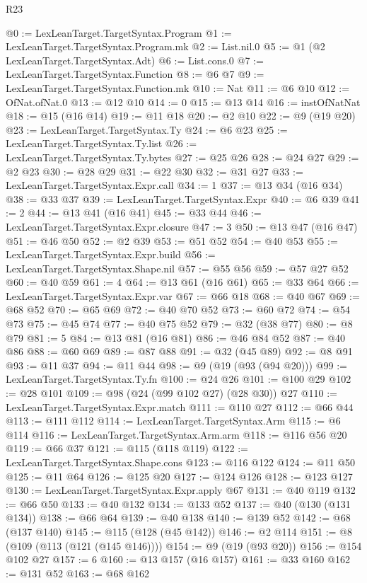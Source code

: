 \begin{lexlean}{R23}
\begin{coremodule}
@0 := LexLeanTarget.TargetSyntax.Program
@1 := LexLeanTarget.TargetSyntax.Program.mk
@2 := List.nil.{0}
@5 := @1 (@2 LexLeanTarget.TargetSyntax.Adt)
@6 := List.cons.{0}
@7 := LexLeanTarget.TargetSyntax.Function
@8 := @6 @7
@9 := LexLeanTarget.TargetSyntax.Function.mk
@10 := Nat
@11 := @6 @10
@12 := OfNat.ofNat.{0}
@13 := @12 @10
@14 := 0
@15 := @13 @14
@16 := instOfNatNat
@18 := @15 (@16 @14)
@19 := @11 @18
@20 := @2 @10
@22 := @9 (@19 @20)
@23 := LexLeanTarget.TargetSyntax.Ty
@24 := @6 @23
@25 := LexLeanTarget.TargetSyntax.Ty.list
@26 := LexLeanTarget.TargetSyntax.Ty.bytes
@27 := @25 @26
@28 := @24 @27
@29 := @2 @23
@30 := @28 @29
@31 := @22 @30
@32 := @31 @27
@33 := LexLeanTarget.TargetSyntax.Expr.call
@34 := 1
@37 := @13 @34 (@16 @34)
@38 := @33 @37
@39 := LexLeanTarget.TargetSyntax.Expr
@40 := @6 @39
@41 := 2
@44 := @13 @41 (@16 @41)
@45 := @33 @44
@46 := LexLeanTarget.TargetSyntax.Expr.closure
@47 := 3
@50 := @13 @47 (@16 @47)
@51 := @46 @50
@52 := @2 @39
@53 := @51 @52
@54 := @40 @53
@55 := LexLeanTarget.TargetSyntax.Expr.build
@56 := LexLeanTarget.TargetSyntax.Shape.nil
@57 := @55 @56
@59 := @57 @27 @52
@60 := @40 @59
@61 := 4
@64 := @13 @61 (@16 @61)
@65 := @33 @64
@66 := LexLeanTarget.TargetSyntax.Expr.var
@67 := @66 @18
@68 := @40 @67
@69 := @68 @52
@70 := @65 @69
@72 := @40 @70 @52
@73 := @60 @72
@74 := @54 @73
@75 := @45 @74
@77 := @40 @75 @52
@79 := @32 (@38 @77)
@80 := @8 @79
@81 := 5
@84 := @13 @81 (@16 @81)
@86 := @46 @84 @52
@87 := @40 @86
@88 := @60 @69
@89 := @87 @88
@91 := @32 (@45 @89)
@92 := @8 @91
@93 := @11 @37
@94 := @11 @44
@98 := @9 (@19 (@93 (@94 @20)))
@99 := LexLeanTarget.TargetSyntax.Ty.fn
@100 := @24 @26
@101 := @100 @29
@102 := @28 @101
@109 := @98 (@24 (@99 @102 @27) (@28 @30)) @27
@110 := LexLeanTarget.TargetSyntax.Expr.match
@111 := @110 @27
@112 := @66 @44
@113 := @111 @112
@114 := LexLeanTarget.TargetSyntax.Arm
@115 := @6 @114
@116 := LexLeanTarget.TargetSyntax.Arm.arm
@118 := @116 @56 @20
@119 := @66 @37
@121 := @115 (@118 @119)
@122 := LexLeanTarget.TargetSyntax.Shape.cons
@123 := @116 @122
@124 := @11 @50
@125 := @11 @64
@126 := @125 @20
@127 := @124 @126
@128 := @123 @127
@130 := LexLeanTarget.TargetSyntax.Expr.apply @67
@131 := @40 @119
@132 := @66 @50
@133 := @40 @132
@134 := @133 @52
@137 := @40 (@130 (@131 @134))
@138 := @66 @64
@139 := @40 @138
@140 := @139 @52
@142 := @68 (@137 @140)
@145 := @115 (@128 (@45 @142))
@146 := @2 @114
@151 := @8 (@109 (@113 (@121 (@145 @146))))
@154 := @9 (@19 (@93 @20))
@156 := @154 @102 @27
@157 := 6
@160 := @13 @157 (@16 @157)
@161 := @33 @160
@162 := @131 @52
@163 := @68 @162

\end{coremodule}
\end{lexlean}
